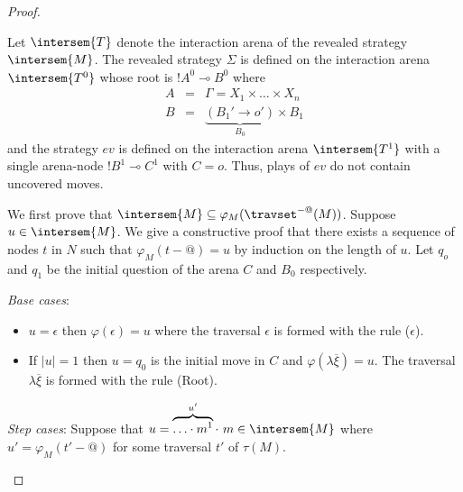 \begin{proof}
\begin{itemize}
    Let $\intersem{T}$ denote the interaction arena of the
    revealed strategy $\intersem{M}$. The revealed strategy
    $\Sigma$ is defined on the interaction arena
    $\intersem{T^0}$ whose root is $!A^0 \multimap B^0$ where
    \begin{eqnarray*}
        A &=& \Gamma = X_1 \times \ldots \times X_n\\
        B &=& \underbrace{(B_1' \rightarrow o')}_{B_0} \times B_1
    \end{eqnarray*}
    and the strategy $ev$ is defined on the interaction arena
    $\intersem{T^1}$ with a single arena-node $!B^1 \multimap
    C^1$ with $C = o$. Thus, plays of $ev$ do not contain
    uncovered moves.


    We first prove that $\intersem{M} \subseteq \varphi_{M}( \travset^{-@}(M)
    )$. Suppose $u \in \intersem{M}$. We give a constructive proof
    that there exists a sequence of nodes $t$ in $N$ such that
    $\varphi_M(t-@) = u$ by induction on the length of $u$. Let
    $q_o$ and $q_1$ be the initial question of the arena
    $C$ and $B_0$ respectively.

    \emph{Base cases}:
    \begin{itemize}
    \item $u=\epsilon$ then $\varphi(\epsilon) = u$ where the traversal $\epsilon$ is formed with the rule ($\epsilon$).
    \item If $|u|=1$ then $u=q_0$ is the initial move in $C$ and $\varphi(\lambda \overline{\xi}) = u$. The traversal
    $\lambda \overline{\xi}$ is formed with the rule (Root).
    \end{itemize}

    \emph{Step cases}: Suppose that $u = \overbrace{\ldots
    \cdot m^1}^{u'} \cdot\ m \in \intersem{M}$ where $u' =
    \varphi_M(t'-@)$ for some traversal $t'$ of $\tau(M)$.



\end{itemize}
\end{proof}
